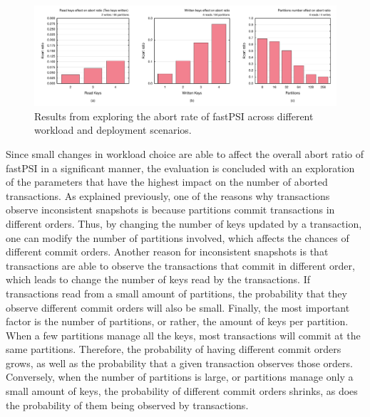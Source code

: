 \begin{figure}[t]
\begin{center}
\includegraphics[width=\textwidth]{figures/psi_read_abort_bench.pdf}
\vspace{-1cm}
\end{center}
\caption{Results from exploring the abort rate of fastPSI across different workload and deployment scenarios.}
\label{fig:fastpsi_abort_rate}
\end{figure}

Since small changes in workload choice are able to affect the overall abort ratio of fastPSI in a significant manner, the evaluation is concluded with an exploration of the parameters that have the highest impact on the number of aborted transactions. As explained previously, one of the reasons why transactions observe inconsistent snapshots is because partitions commit transactions in different orders. Thus, by changing the number of keys updated by a transaction, one can modify the number of partitions involved, which affects the chances of different commit orders. Another reason for inconsistent snapshots is that transactions are able to observe the transactions that commit in different order, which leads to change the number of keys read by the transactions. If transactions read from a small amount of partitions, the probability that they observe different commit orders will also be small. Finally, the most important factor is the number of partitions, or rather, the amount of keys per partition. When a few partitions manage all the keys, most transactions will commit at the same partitions. Therefore, the probability of having different commit orders grows, as well as the probability that a given transaction observes those orders. Conversely, when the number of partitions is large, or partitions manage only a small amount of keys, the probability of different commit orders shrinks, as does the probability of them being observed by transactions.

